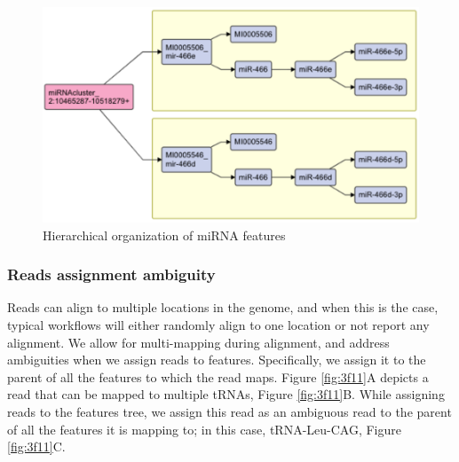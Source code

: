 \documentclass[12pt,twoside]{reedthesis}
\begin{document}
\begin{figure}[htbp]

{\centering \includegraphics{thesis_files/figure-latex/3f10-1} 

}

\caption{Hierarchical organization of miRNA features}\label{fig:3f10}
\end{figure}
\hypertarget{reads-assignment-ambiguity}{%
\subsubsection{Reads assignment ambiguity}\label{reads-assignment-ambiguity}}

Reads can align to multiple locations in the genome, and when this is
the case, typical workflows will either randomly align to one location
or not report any alignment. We allow for multi-mapping during
alignment, and address ambiguities when we assign reads to features.
Specifically, we assign it to the parent of all the features to which
the read maps. Figure \ref{fig:3f11}A depicts a read that can be mapped to multiple
tRNAs, Figure \ref{fig:3f11}B. While assigning reads to the features tree, we assign
this read as an ambiguous read to the parent of all the features it is
mapping to; in this case, tRNA-Leu-CAG, Figure \ref{fig:3f11}C.
\end{document}
